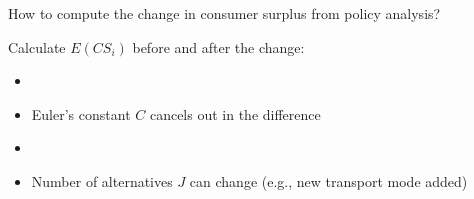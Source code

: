 \documentclass[aspectratio=169]{beamer}
\begin{document}
\begin{frame}
How to compute the change in consumer surplus from policy analysis?
\bigskip{}

Calculate $E(CS_i)$ before and after the change:

\begin{itemize}
    \item[]
    \item<3-> Euler's constant $C$ cancels out in the difference
    \item[]
    \item<3-> Number of alternatives $J$ can change (e.g., new transport mode added)
\end{itemize}


\end{frame}
\end{document}
